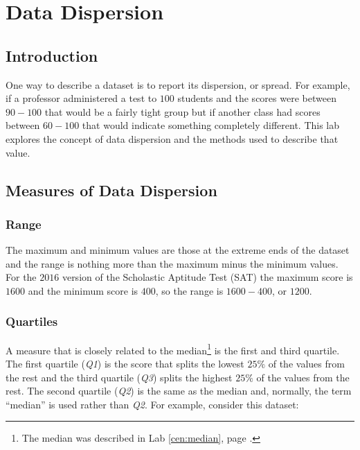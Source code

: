 \chapter{Data Dispersion} \label{dis:data_dispersion}

\section{Introduction}

One way to describe a dataset is to report its dispersion, or spread. For example, if a professor administered a test to $ 100 $ students and the scores were between $ 90 - 100 $ that would be a fairly tight group but if another class had scores between $ 60 - 100 $ that would indicate something completely different. This lab explores the concept of data dispersion and the methods used to describe that value.

\section{Measures of Data Dispersion}

\subsection{Range}

The maximum and minimum values are those at the extreme ends of the dataset and the range is nothing more than the maximum minus the minimum values. For the $ 2016 $ version of the Scholastic Aptitude Test (SAT) the maximum score is $ 1600 $ and the minimum score is $ 400 $, so the range is $ 1600-400 $, or $ 1200 $.

\subsection{Quartiles}

A measure that is closely related to the median\footnote{The median was described in Lab \ref{cen:median}, page \pageref{cen:median}.} is the first and third quartile. The first quartile (\textit{Q1}) is the score that splits the lowest $ 25\% $ of the values from the rest and the third quartile (\textit{Q3}) splits the highest $ 25\% $ of the values from the rest. The second quartile (\textit{Q2}) is the same as the median and, normally, the term ``median'' is used rather than \textit{Q2}. For example, consider this dataset: 

